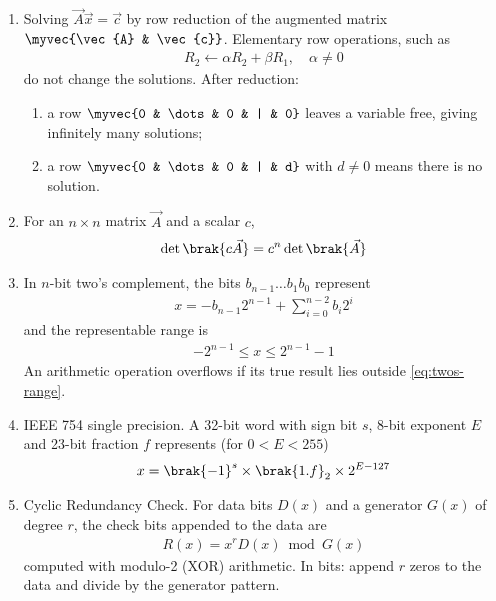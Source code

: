 \begin{enumerate}[label=\thesubsection.\arabic*, ref=\thesubsection.\theenumi]
\item Solving $\vec{A}\vec{x} = \vec{c}$ by row reduction of the augmented
matrix $\myvec{\vec{A} & \vec{c}}$. Elementary row operations, such as
\begin{align}
R_2 \leftarrow \alpha R_2 + \beta R_1, \quad \alpha \ne 0
\label{eq:row-op}
\end{align}
do not change the solutions. After reduction:
\begin{enumerate}[label=\alph*)]
\item a row $\myvec{0 & \dots & 0 & | & 0}$ leaves a variable free, giving
infinitely many solutions;
\item a row $\myvec{0 & \dots & 0 & | & d}$ with $d \ne 0$ means there is
no solution.
\end{enumerate}
\label{fm:row-reduce}

\item For an $n \times n$ matrix $\vec{A}$ and a scalar $c$,
\begin{align}
\det\brak{c\vec{A}} = c^{n}\det\brak{\vec{A}}
\label{eq:det-scale}
\end{align}

\item In $n$-bit two's complement, the bits $b_{n-1} \dots b_1 b_0$
represent
\begin{align}
x = -b_{n-1} 2^{n-1} + \sum_{i=0}^{n-2} b_i 2^{i}
\label{eq:twos-val}
\end{align}
and the representable range is
\begin{align}
-2^{n-1} \le x \le 2^{n-1} - 1
\label{eq:twos-range}
\end{align}
An arithmetic operation overflows if its true result lies outside
\eqref{eq:twos-range}.

\item IEEE 754 single precision. A 32-bit word with sign bit $s$, 8-bit
exponent $E$ and 23-bit fraction $f$ represents (for $0 < E < 255$)
\begin{align}
x = \brak{-1}^{s} \times \brak{1.f}_2 \times 2^{E - 127}
\label{eq:ieee}
\end{align}

\item Cyclic Redundancy Check. For data bits $D(x)$ and a generator $G(x)$
of degree $r$, the check bits appended to the data are
\begin{align}
R(x) = x^{r} D(x) \bmod G(x)
\label{eq:crc}
\end{align}
computed with modulo-2 (XOR) arithmetic. In bits: append $r$ zeros to
the data and divide by the generator pattern.


\end{enumerate}
